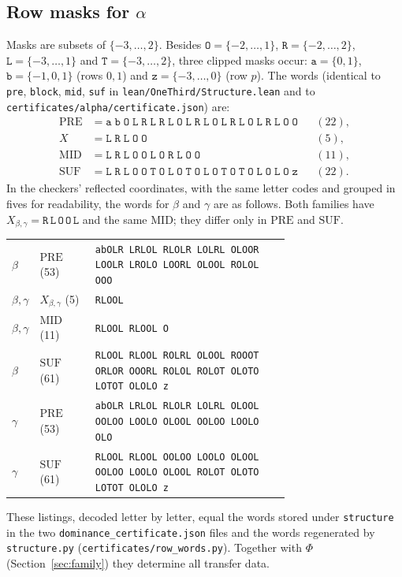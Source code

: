 \documentclass[11pt]{amsart}
\theoremstyle{definition}
\theoremstyle{remark}
\newcommand{\mk}[1]{\mathtt{#1}}
\begin{document}
\subsection*{Row masks for $\alpha$}
Masks are subsets of $\{-3,\dots,2\}$. Besides $\mk{O}=\{-2,\dots,1\}$, $\mk{R}=\{-2,\dots,2\}$, $\mk{L}=\{-3,\dots,1\}$ and $\mk{T}=\{-3,\dots,2\}$, three clipped masks occur: $\mk{a}=\{0,1\}$, $\mk{b}=\{-1,0,1\}$ (rows $0,1$) and $\mk{z}=\{-3,\dots,0\}$ (row $p$). The words (identical to \texttt{pre}, \texttt{block}, \texttt{mid}, \texttt{suf} in \texttt{lean/OneThird/Structure.lean} and to \texttt{certificates/alpha/certificate.json}) are:
\[
\begin{aligned}
\mathrm{PRE}&=\mk{a}\;\mk{b}\;\mk{O}\;\mk{L}\;\mk{R}\;\mk{L}\;\mk{R}\;\mk{L}\;\mk{O}\;\mk{L}\;\mk{R}\;\mk{L}\;\mk{O}\;\mk{L}\;\mk{R}\;\mk{L}\;\mk{O}\;\mk{L}\;\mk{R}\;\mk{L}\;\mk{O}\;\mk{O} &&(22),\\
X&=\mk{L}\;\mk{R}\;\mk{L}\;\mk{O}\;\mk{O} &&(5),\\
\mathrm{MID}&=\mk{L}\;\mk{R}\;\mk{L}\;\mk{O}\;\mk{O}\;\mk{L}\;\mk{O}\;\mk{R}\;\mk{L}\;\mk{O}\;\mk{O} &&(11),\\
\mathrm{SUF}&=\mk{L}\;\mk{R}\;\mk{L}\;\mk{O}\;\mk{O}\;\mk{T}\;\mk{O}\;\mk{L}\;\mk{O}\;\mk{T}\;\mk{O}\;\mk{L}\;\mk{O}\;\mk{T}\;\mk{O}\;\mk{T}\;\mk{O}\;\mk{L}\;\mk{O}\;\mk{L}\;\mk{O}\;\mk{z} &&(22).
\end{aligned}
\]
In the checkers' reflected coordinates, with the same letter codes and grouped in fives for readability, the words for $\beta$ and $\gamma$ are as follows. Both families have $X_{\beta,\gamma}=\mk{R}\,\mk{L}\,\mk{O}\,\mk{O}\,\mk{L}$ and the same $\mathrm{MID}$; they differ only in $\mathrm{PRE}$ and $\mathrm{SUF}$.
\begin{center}\footnotesize
\begin{tabular}{@{}l l p{0.70\linewidth}@{}}
$\beta$ & $\mathrm{PRE}$ (53) & \texttt{abOLR LRLOL RLOLR LOLRL OLOOR LOOLR LROLO LOORL OLOOL ROLOL OOO}\\
$\beta,\gamma$ & $X_{\beta,\gamma}$ (5) & \texttt{RLOOL}\\
$\beta,\gamma$ & $\mathrm{MID}$ (11) & \texttt{RLOOL RLOOL O}\\
$\beta$ & $\mathrm{SUF}$ (61) & \texttt{RLOOL RLOOL ROLRL OLOOL ROOOT ORLOR OOORL ROLOL ROLOT OLOTO LOTOT OLOLO z}\\
$\gamma$ & $\mathrm{PRE}$ (53) & \texttt{abOLR LRLOL RLOLR LOLRL OLOOL OOLOO LOOLO OLOOL OOLOO LOOLO OLO}\\
$\gamma$ & $\mathrm{SUF}$ (61) & \texttt{RLOOL RLOOL OOLOO LOOLO OLOOL OOLOO LOOLO OLOOL ROLOT OLOTO LOTOT OLOLO z}\\
\end{tabular}
\end{center}
These listings, decoded letter by letter, equal the words stored under \texttt{structure} in the two \texttt{dominance\_certificate.json} files and the words regenerated by \texttt{structure.py} (\texttt{certificates/row\_words.py}). Together with $\Phi$ (Section~\ref{sec:family}) they determine all transfer data.
\end{document}
